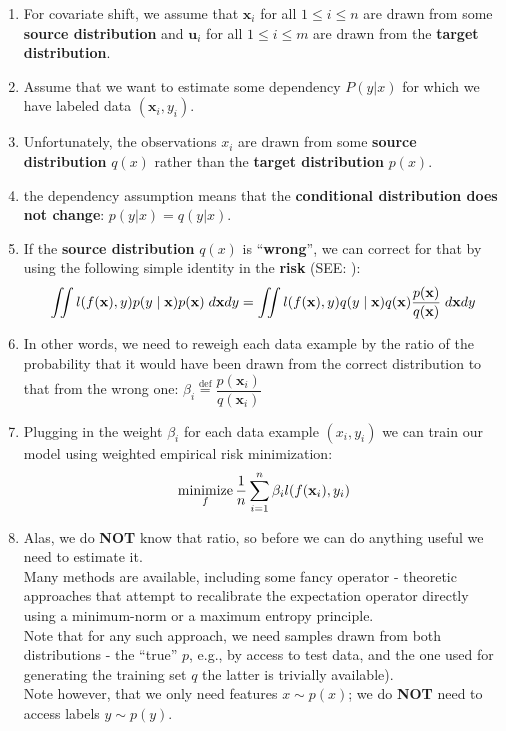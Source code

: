 \begin{enumerate}[itemsep=0.2cm]
    \item  For covariate shift, we assume that $\mathbf{x}_i$ for all $1 \leq i \leq n$ are drawn from some \textbf{source distribution} and $\mathbf{u}_i$ for all $1 \leq i \leq m$ are drawn from the \textbf{target distribution}.

    \item Assume that we want to estimate some dependency $P(y | x)$ for which we have labeled data $(\mathbf{x}_i, y_i)$.

    \item Unfortunately, the observations $x_i$ are drawn from some \textbf{source distribution} $q(x)$ rather than the \textbf{target distribution} $p(x)$.

    \item the dependency assumption means that the \textbf{conditional distribution does not change}: $p(y | x) = q(y | x)$.

    \item If the \textbf{source distribution} $q(x)$ is “\textbf{wrong}”, we can correct for that by using the following simple identity in the \textbf{risk} (SEE: ):
    \[
        \hfill
        \iint l(f(\mathbf{x}), y) p(y \mid \mathbf{x})p(\mathbf{x}) \;d\mathbf{x}dy =
        \iint l(f(\mathbf{x}), y) q(y \mid \mathbf{x})q(\mathbf{x})\dfrac{p(\mathbf{x})}{q(\mathbf{x})} \;d\mathbf{x}dy
        \hfill
    \]

    \item In other words, we need to reweigh each data example by the ratio of the probability that it would have been drawn from the correct distribution to that from the wrong one:
    $
        \beta_i \stackrel{\textrm{def}}{=} \dfrac{p(\mathbf{x}_i)}{q(\mathbf{x}_i)}
    $

    \item Plugging in the weight $\beta_i$ for each data example $(x_i, y_i)$ we can train our model using weighted empirical risk minimization:
    \[
        \hfill
        \displaystyle\mathop{\mathrm{minimize}}_f \dfrac{1}{n} 
        \dsum_{i=1}^n \beta_i l(f(\mathbf{x}_i), y_i)
        \hfill
    \]

    \item Alas, we do \textbf{NOT} know that ratio, so before we can do anything useful we need to estimate it.\\
    Many methods are available, including some fancy operator - theoretic approaches that attempt to recalibrate the expectation operator directly using a minimum-norm or a maximum entropy principle.\\
    Note that for any such approach, we need samples drawn from both distributions - the “true” $p$, e.g., by access to test data, and the one used for generating the training set $q$ the latter is trivially available).\\
    Note however, that we only need features $x \sim p(x)$; we do \textbf{NOT} need to access labels $y \sim p(y)$.


\end{enumerate}
